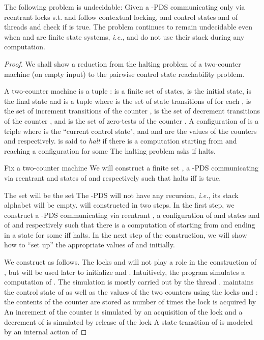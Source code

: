 \documentclass{LMCS}
\begin{document}
\begin{lemma}
\label{thm:contextundecid}
The following problem is undecidable:
Given a -PDS  communicating only via reentrant locks   s.t.  and  follow contextual locking, and control states  and
 of  threads  and   check if  is  true. The problem continues to remain undecidable even when  and  are finite state systems, \emph{i.e.},  and   do not use their stack during any computation.
\end{lemma}
\begin{proof}
We shall show a reduction from the halting problem of a two-counter machine (on empty input)  to the pairwise control state reachability problem. 

A two-counter machine  is a tuple :   is a finite set of states,  is the initial state,  is the final state and  is a tuple  where
  is the set of state transitions of    for each ,   is the set  of increment transitions of
the  counter ,  is the set of decrement transitions of
the  counter , and  is the set of zero-tests of the  counter .
A configuration of  is a triple 
 where  is the ``current control state", and  and  are the values of the counters  and  respectively.  
 is said to \emph{halt}  if there is a computation starting from  and reaching a configuration  for some 
The halting problem asks if  halts.


Fix a two-counter machine  We will construct a  finite set , a -PDS  communicating via reentrant  and states  of  and  respectively such that  halts iff  is true. 

The set  will be the set  
The -PDS  will not have any recursion, \emph{i.e.}, its stack alphabet  will be empty.  will constructed in two steps. In the first step, we construct a -PDS  communicating via reentrant   , a configuration  of  and states  and  of  and  respectively such that there is a computation of  starting from  and ending in a state  for some  iff  halts. In the next step of the construction, we will show how to ``set up'' the appropriate values of  and  initially.


We construct  as follows. The locks  and  will not play a role in the construction of , but will
be used later to initialize  and .
 Intuitively,  the program   simulates a computation of .
The simulation is mostly carried out by the thread .   maintains the control state
 of  as well as the values of the two counters  using the locks  and : 
 the contents of the counter  are stored as number of times  the lock  is acquired by  
 An increment of the counter  is simulated by an acquisition of the lock  and a decrement of  is simulated by release of the lock  A state transition of  is modeled by an internal action of 
 

\end{proof}
\end{document}
